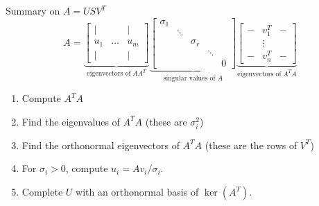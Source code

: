 \documentclass[10pt]{beamer}
\begin{document}
\begin{frame}{Summary on  $A=USV^T$}
\[
A =
\underbrace{
\begin{bmatrix}
    | &  & | \\
    u_1    & \dots  & u_m \\
    | &   & |
\end{bmatrix}}_{\textrm{eigenvectors of}\; AA^T}
\underbrace{
\begin{bmatrix}
    \sigma_1 &        &          &        &\\
             & \ddots &          &        & \\
             &        & \sigma_r &        & \\
             &        &          & \ddots & \\
             &        &          &        & 0 
\end{bmatrix}}_{\textrm{singular values of }A}
\underbrace{
\begin{bmatrix}
    - & v_1^T & -\\
     & \vdots & \\
    - & v_n^T & -
\end{bmatrix}}_{\textrm{eigenvectors of}\; A^TA}
\]
\begin{enumerate}
\item Compute $A^TA$ 
\item Find the eigenvalues of $A^TA$ (these are $\sigma_i^2$) 
\item Find the orthonormal eigenvectors of $A^TA$ (these are the rows of $V^T$) 
\item For $\sigma_i>0$, compute $u_i=Av_i/\sigma_i$.
\item Complete $U$ with an orthonormal basis of $\ker(A^T)$.
\end{enumerate}

\end{frame}
\end{document}

